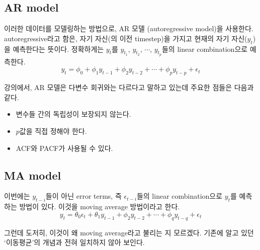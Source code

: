 \documentclass{article}
\begin{document}
%
\subsection{AR model}
이러한 데이터를 모델링하는 방법으로, AR 모델 (autoregressive model)을 사용한다.
autoregressive라고 함은, 자기 자신(의 이전 timestep)을 가지고 현재의 자기 자신($y_t$)을 예측한다는 뜻이다.
정확하게는 \(y_t\)를 \(y_{t_1}\), \(y_{t_2}\), \(\cdots\), \(y_{t_p}\)들의 linear combination으로 예측한다.
\[y_t = \phi_0+\phi_1y_{t-1}+\phi_2y_{t-2}+\cdots+\phi_py_{t-p}+\epsilon_t\]

강의에서, AR 모델은 다변수 회귀와는 다르다고 말하고 있는데 주요한 점들은 다음과 같다.
\begin{itemize}
\item
변수들 간의 독립성이 보장되지 않는다.
\item
\(p\)값을 직접 정해야 한다.
\item
ACF와 PACF가 사용될 수 있다.
\end{itemize}

%
\subsection{MA model}
이번에는 \(y_{t-i}\)들이 아닌 error terms, 즉 \(\epsilon_{t-i}\)들의 linear combination으로 \(y_t\)를 예측하는 방법이 있다.
이것을 moving average 방법이라고 한다.
\[y_t = \theta_0\epsilon_t+\theta_1y_{t-1}+\phi_2y_{t-2}+\cdots+\phi_qy_{t-q}+\epsilon_t\]

그런데 도저히, 이것이 왜 moving average라고 불리는 지 모르겠다.
기존에 알고 있던 `이동평균'의 개념과 전혀 일치하지 않아 보인다.

\end{document}
